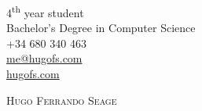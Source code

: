 \documentclass[a4paper, 11pt]{article}
\begin{document}
\pagestyle{empty} %

\begin{flushright}
    4\textsuperscript{th} year student\\
    Bachelor's Degree in Computer Science\\
    +34 680 340 463\\
    \href{mailto: me@hugofs.com}{me@hugofs.com}\\
    \href{https://hugofs.com}{hugofs.com}\\
\end{flushright}

\vspace{-40mm}

\begin{figure}[ht!]
    \begin{flushleft}
    \end{flushleft}
\end{figure}

{\textsc {\Huge \vspace{5mm} \hspace{-13mm} Hugo Ferrando Seage}}\\
\end{document}
